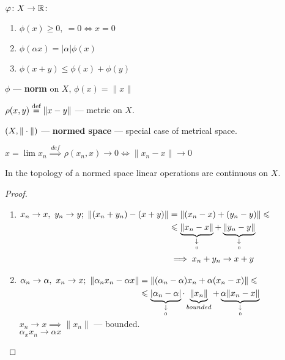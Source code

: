 $\varphi\colon X \to \mathbb{R}\colon$
\begin{enumerate}
\item $\phi(x) \geq 0,\ = 0 \iff x = 0$
\item $\phi(\alpha x) = |\alpha| \phi(x)$
\item $\phi(x + y) \leq \phi(x) + \phi(y)$
\end{enumerate}

\begin{defn}
  $\phi$ --- \textbf{norm} on $X$, $\phi(x) = \|x\|$
\end{defn}

$\rho(x, y) \overset{\text{def}}{=} \|x - y\|$ --- metric on $X$.

\begin{defn}
  $\\(X, \|\cdot\|)$ --- \textbf{normed space} --- special case of metrical space.
\end{defn}

\noindent
$x = \lim x_n \overset{def}{\implies} \rho(x_n, x) \to 0 \iff \|x_n - x\| \to 0$

\begin{stm}
  In the topology of a normed space linear operations are continuous on $X$.
\end{stm}

\begin{proof}\leavevmode
  \begin{enumerate}
  \item
    $\begin{aligned}[t]
      x_n \to x,\ y_n \to y;\ \|(x_n + y_n) - (x + y)\| & = \|(x_n - x) + (y_n - y)\|  \leqslant \\
      & \leqslant  \underbrace{\|x_n - x\|}_{\underset{0}{\downarrow}} + \underbrace{\|y_n - y\|}_{\underset{0}{\downarrow}} \\
      & \implies x_n + y_n \to x + y
    \end{aligned}$
  \item
    $\begin{aligned}[t]
       \alpha_n \to \alpha,\ x_n \to x;\ \|\alpha_n x_n - \alpha x\| & =
        \|(\alpha_n - \alpha)x_n + \alpha(x_n - x)\| \leqslant \\
        & \leqslant \underbrace{|\alpha_n - \alpha|}_{\underset{0}{\downarrow}} \cdot \underbrace{\|x_n\|}_{bounded} + \underbrace{\alpha\|x_n - x\|}_{\underset{0}{\downarrow}}
    \end{aligned}$ \\
    $x_n \to x \implies \|x_n\|$ --- bounded. \\
    $\alpha_x x_n \to \alpha x$ \qedhere
  \end{enumerate}
\end{proof}

